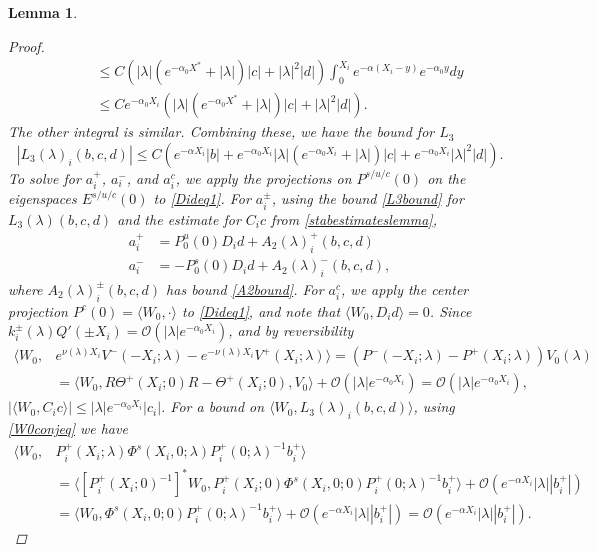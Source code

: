\documentclass[12pt]{elsarticle}
\theoremstyle{plain}
\newtheorem{lemma}[theorem]{Lemma}
\theoremstyle{definition}
\theoremstyle{remark}
\numberwithin{theorem}{section}
\numberwithin{equation}{section}
\begin{document}
\begin{lemma}
\begin{proof}
\begin{align*}
&\qquad \leq C \left( |\lambda|(e^{-\alpha_0 X^*}+ |\lambda|) |c| + |\lambda|^2 |d| \right) \int_0^{X_i} e^{-\alpha(X_i - y)} e^{-\alpha_0 y} dy \\
&\qquad \leq C e^{-\alpha_0 X_i}\left( |\lambda|(e^{-\alpha_0 X^*}+ |\lambda|) |c| + |\lambda|^2 |d| \right).
\end{align*}
The other integral is similar. Combining these, we have the bound for $L_3$
\begin{equation}\label{L3bound}
|L_3(\lambda)_i(b, c, d)| \leq C \left( e^{-\alpha X_i} |b| + e^{-\alpha_0 X_i} |\lambda| (e^{-\alpha_0 X_i } + |\lambda|) |c| + e^{-\alpha_0 X_i} |\lambda|^2 |d| \right).
\end{equation}
To solve for $a_i^+$, $a_i^-$, and $a_i^c$, we apply the projections on $P^{s/u/c}(0)$ on the eigenspaces $E^{s/u/c}(0)$ to \cref{Dideq1}. For $a_i^\pm$, using the bound \cref{L3bound} for $L_3(\lambda)(b, c, d)$ and the estimate for $C_i c$ from \cref{stabestimateslemma},
\begin{align*}
a_i^+ &= P_0^u(0) D_i d + A_2(\lambda)_i^+(b, c, d) \\
a_i^- &= -P_0^s(0) D_i d + A_2(\lambda)_i^-(b, c, d),
\end{align*}
where $A_2(\lambda)_i^\pm(b, c, d)$ has bound \cref{A2bound}. For $a_i^c$, we apply the center projection $P^c(0) = \langle W_0, \cdot \rangle$ to \cref{Dideq1}, and note that $\langle W_0, D_i d\rangle = 0$. Since $k_i^\pm(\lambda)Q'(\pm X_i) = \mathcal{O}(|\lambda|e^{-\alpha_0 X_i})$, and by reversibility
\begin{align*}
\langle W_0, &e^{\nu(\lambda) X_i} V^-(-X_i; \lambda) - e^{-\nu(\lambda) X_i} V^+(X_i; \lambda) \rangle = \left( P^-(-X_i; \lambda) - P^+(X_i; \lambda) \right) V_0(\lambda) \\
&= \langle W_0, R \Theta^+(X_i; 0) R - \Theta^+(X_i; 0), V_0 \rangle + \mathcal{O}(|\lambda|e^{-\alpha_0 X_i}) = \mathcal{O}(|\lambda|e^{-\alpha_0 X_i}),
\end{align*}
$|\langle W_0, C_i c\rangle| \leq |\lambda|e^{-\alpha_0 X_i}|c_i|$. For a bound on $\langle W_0, L_3(\lambda)_i(b,c,d) \rangle$, using \cref{W0conjeq} we have
\begin{align*}
\langle W_0, &P_i^+(X_i; \lambda)\Phi^s(X_i, 0; \lambda) P_i^+(0; \lambda)^{-1} b_i^+ \rangle
\\ 
&= \langle [P_i^+(X_i; 0)^{-1}]^* W_0, P_i^+(X_i; 0)\Phi^s(X_i, 0; 0) P_i^+(0; \lambda)^{-1} b_i^+ \rangle + \mathcal{O}(e^{-\alpha X_i} |\lambda||b_i^+|) \\
&= \langle W_0, \Phi^s(X_i, 0; 0)  P_i^+(0; \lambda)^{-1} b_i^+ \rangle + \mathcal{O}(e^{-\alpha X_i} |\lambda||b_i^+|) = \mathcal{O}(e^{-\alpha X_i} |\lambda||b_i^+|).

\end{align*}
\end{proof}
\end{lemma}
\end{document}
